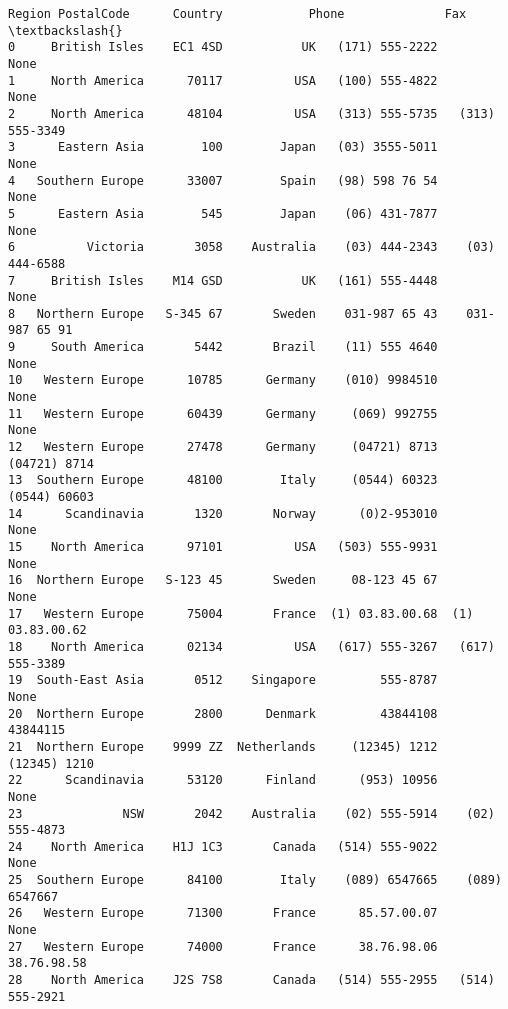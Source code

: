 \documentclass[11pt]{article}
\begin{document}
\begin{Verbatim}[commandchars=\\\{\}]
             Region PostalCode      Country            Phone              Fax  \textbackslash{}
0     British Isles    EC1 4SD           UK   (171) 555-2222             None
1     North America      70117          USA   (100) 555-4822             None
2     North America      48104          USA   (313) 555-5735   (313) 555-3349
3      Eastern Asia        100        Japan   (03) 3555-5011             None
4   Southern Europe      33007        Spain   (98) 598 76 54             None
5      Eastern Asia        545        Japan    (06) 431-7877             None
6          Victoria       3058    Australia    (03) 444-2343    (03) 444-6588
7     British Isles    M14 GSD           UK   (161) 555-4448             None
8   Northern Europe   S-345 67       Sweden    031-987 65 43    031-987 65 91
9     South America       5442       Brazil    (11) 555 4640             None
10   Western Europe      10785      Germany    (010) 9984510             None
11   Western Europe      60439      Germany     (069) 992755             None
12   Western Europe      27478      Germany     (04721) 8713     (04721) 8714
13  Southern Europe      48100        Italy     (0544) 60323     (0544) 60603
14      Scandinavia       1320       Norway      (0)2-953010             None
15    North America      97101          USA   (503) 555-9931             None
16  Northern Europe   S-123 45       Sweden     08-123 45 67             None
17   Western Europe      75004       France  (1) 03.83.00.68  (1) 03.83.00.62
18    North America      02134          USA   (617) 555-3267   (617) 555-3389
19  South-East Asia       0512    Singapore         555-8787             None
20  Northern Europe       2800      Denmark         43844108         43844115
21  Northern Europe    9999 ZZ  Netherlands     (12345) 1212     (12345) 1210
22      Scandinavia      53120      Finland      (953) 10956             None
23              NSW       2042    Australia    (02) 555-5914    (02) 555-4873
24    North America    H1J 1C3       Canada   (514) 555-9022             None
25  Southern Europe      84100        Italy    (089) 6547665    (089) 6547667
26   Western Europe      71300       France      85.57.00.07             None
27   Western Europe      74000       France      38.76.98.06      38.76.98.58
28    North America    J2S 7S8       Canada   (514) 555-2955   (514) 555-2921


\end{Verbatim}
\end{document}
